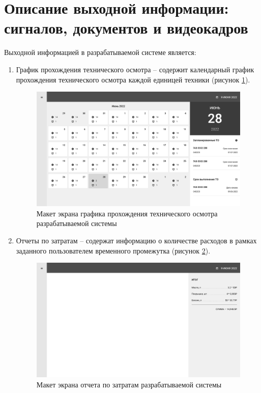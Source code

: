 \documentclass[../nirs.tex]{subfiles}
\begin{document}
\section{Описание выходной информации: сигналов, документов и видеокадров}
Выходной информацией в разрабатываемой системе является:
\begin{enumerate}
	\item График прохождения технического осмотра -- содержит календарный график
        прохождения технического осмотра каждой единицей техники (рисунок
        \ref{fig:design-calendar}).

        \begin{figure}[H]
        \centering
        \includegraphics[keepaspectratio,width=\textwidth]{./images/calendar-planning.png}
        \caption{Макет экрана графика прохождения технического осмотра
            разрабатываемой системы}
        \label{fig:design-calendar}
        \end{figure}

	\item Отчеты по затратам -- содержат информацию о количестве расходов в
		рамках заданного пользователем временного промежутка (рисунок
        \ref{fig:design-report}).

        \begin{figure}[H]
        \centering
        \includegraphics[keepaspectratio,width=\textwidth]{./images/expenses-report.png}
        \caption{Макет экрана отчета по затратам разрабатываемой системы}
        \label{fig:design-report}
        \end{figure}
\end{enumerate}
\end{document}
